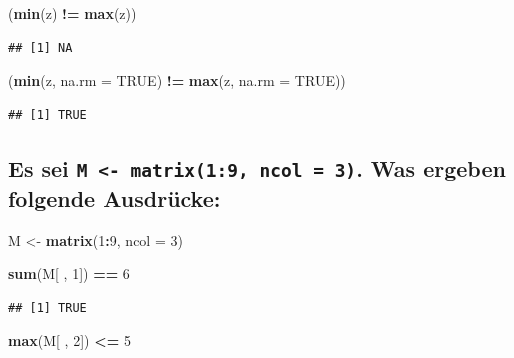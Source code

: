\documentclass[12pt,a4paper]{article}
\newenvironment{Shaded}{\begin{snugshade}}{\end{snugshade}}
\newcommand{\AttributeTok}[1]{\textcolor[rgb]{0.13,0.29,0.53}{#1}}
\newcommand{\ConstantTok}[1]{\textcolor[rgb]{0.56,0.35,0.01}{#1}}
\newcommand{\DecValTok}[1]{\textcolor[rgb]{0.00,0.00,0.81}{#1}}
\newcommand{\FunctionTok}[1]{\textcolor[rgb]{0.13,0.29,0.53}{\textbf{#1}}}
\newcommand{\NormalTok}[1]{#1}
\newcommand{\OtherTok}[1]{\textcolor[rgb]{0.56,0.35,0.01}{#1}}
\newcommand{\SpecialCharTok}[1]{\textcolor[rgb]{0.81,0.36,0.00}{\textbf{#1}}}
\begin{document}
\begin{Shaded}
\begin{Highlighting}[]
\NormalTok{    (}\FunctionTok{min}\NormalTok{(z) }\SpecialCharTok{!=} \FunctionTok{max}\NormalTok{(z))}
\end{Highlighting}
\end{Shaded}

\begin{verbatim}
## [1] NA
\end{verbatim}

\begin{Shaded}
\begin{Highlighting}[]
\NormalTok{    (}\FunctionTok{min}\NormalTok{(z, }\AttributeTok{na.rm =} \ConstantTok{TRUE}\NormalTok{) }\SpecialCharTok{!=} \FunctionTok{max}\NormalTok{(z, }\AttributeTok{na.rm =} \ConstantTok{TRUE}\NormalTok{))}
\end{Highlighting}
\end{Shaded}

\begin{verbatim}
## [1] TRUE
\end{verbatim}

\hypertarget{es-sei-m---matrix19-ncol-3.-was-ergeben-folgende-ausdruxfccke}{%
\subsection{\texorpdfstring{Es sei
\texttt{M\ \textless{}-\ matrix(1:9,\ ncol\ =\ 3)}. Was ergeben folgende
Ausdrücke:}{Es sei M \textless- matrix(1:9, ncol = 3). Was ergeben folgende Ausdrücke:}}\label{es-sei-m---matrix19-ncol-3.-was-ergeben-folgende-ausdruxfccke}}

\begin{Shaded}
\begin{Highlighting}[]
\NormalTok{    M }\OtherTok{\textless{}{-}} \FunctionTok{matrix}\NormalTok{(}\DecValTok{1}\SpecialCharTok{:}\DecValTok{9}\NormalTok{, }\AttributeTok{ncol =} \DecValTok{3}\NormalTok{)}
    
    \FunctionTok{sum}\NormalTok{(M[ , }\DecValTok{1}\NormalTok{]) }\SpecialCharTok{==} \DecValTok{6}
\end{Highlighting}
\end{Shaded}

\begin{verbatim}
## [1] TRUE
\end{verbatim}

\begin{Shaded}
\begin{Highlighting}[]
    \FunctionTok{max}\NormalTok{(M[ , }\DecValTok{2}\NormalTok{]) }\SpecialCharTok{\textless{}=} \DecValTok{5}
\end{Highlighting}
\end{Shaded}
\end{document}
